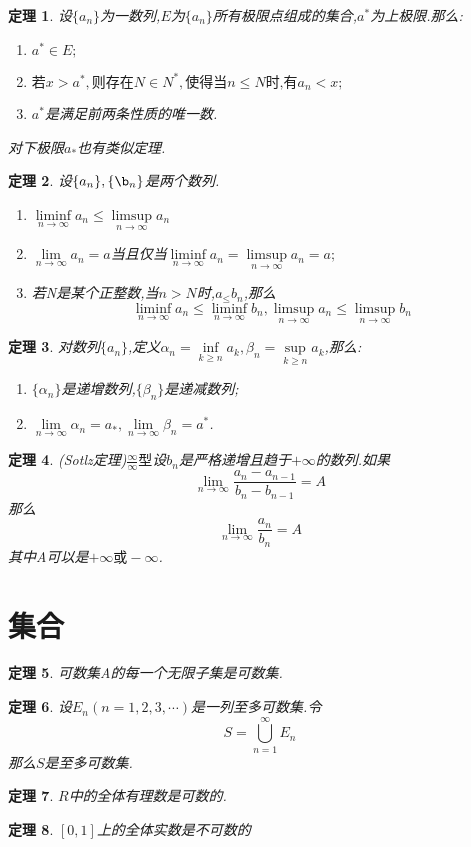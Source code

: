 \documentclass[UTF8]{ctexart}
\newtheorem{theorem}{定理}[section]
\begin{document}
\begin{theorem}
		设$\{a_n\}$为一数列,$E$为$\{a_n\}$所有极限点组成的集合,$a^*$为上极限.那么:
	\begin{enumerate}
		\item $a^*\in E;$
		\item $\mbox{若} x>a^*,\mbox{则存在}N\in N^*,\mbox{使得当}n\leq N\mbox{时,有}a_n<x; $
		\item $a^*$是满足前两条性质的唯一数.
	\end{enumerate}
	对下极限$a_*$也有类似定理.
\end{theorem}
\begin{theorem}
	设$\{a_n\},\{\b_n\}$是两个数列.
\begin{enumerate}
	\item $\liminf\limits_{n\to \infty} a_n\leq \limsup\limits_{n\to \infty} a_n$
	\item $\lim\limits_{n\to \infty}a_n=a$当且仅当$\liminf\limits_{n\to \infty}a_n=\limsup\limits_{n\to \infty}a_n=a;$
	\item 若\textup{N}是某个正整数,当$n>N$时,$a_\leq b_n$,那么\[\liminf\limits_{n\to \infty}a_n\leq\liminf\limits_{n\to \infty}b_n,\limsup\limits_{n\to \infty}a_n\leq\limsup\limits_{n\to \infty}b_n\]
\end{enumerate}
\end{theorem}
\begin{theorem}
	对数列$\{a_n\}$,定义$\alpha_n=\inf\limits_{k\geq n}a_k,\beta_n=\sup\limits_{k\geq n}a_k$,那么:
	\begin{enumerate}
		\item $\{\alpha_n\}$是递增数列,$\{\beta_n\}$是递减数列;
		\item $\lim\limits_{n\to \infty}\alpha_n=a_*,\lim\limits_{n\to \infty}\beta_n=a^*$.
	\end{enumerate}
\end{theorem}
\begin{theorem}
  (Sotlz定理)$\frac{\infty}{\infty}\mbox{型}$设${b_n}$是严格递增且趋于$+\infty$的数列.如果
  $$\lim\limits_{n \to \infty} \frac{a_n-a_{n-1}}{b_n-b_{n-1}}=A$$
  那么
  $$\lim\limits_{n \to \infty}\frac{a_n}{b_n}=A$$其中A可以是$+\infty \mbox{或} -\infty$.
\end{theorem}

\section{集合}
\begin{theorem}
  可数集A的每一个无限子集是可数集.
\end{theorem}
\begin{theorem}
  设${E_n}(n=1,2,3,\cdots)$是一列至多可数集.令
  \[S=\bigcup\limits_{n=1}^\infty E_n\]
  那么$S$是至多可数集.
\end{theorem}
\begin{theorem}
  $R$中的全体有理数是可数的.
\end{theorem}
\begin{theorem}
  $[0,1]$上的全体实数是不可数的
\end{theorem}
\end{document}

